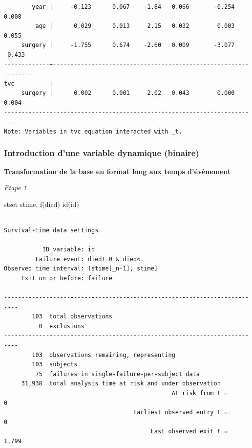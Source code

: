 \documentclass[
  12pt,
  letterpaper,
  DIV=11,
  numbers=noendperiod,
  onepage,
  openany]{scrreprt}
\newenvironment{Shaded}{\begin{snugshade}}{\end{snugshade}}
\newcommand{\KeywordTok}[1]{\textcolor[rgb]{0.94,0.87,0.69}{#1}}
\newcommand{\NormalTok}[1]{\textcolor[rgb]{0.80,0.80,0.80}{#1}}
\begin{document}
\begin{verbatim}
        year |     -0.123      0.067    -1.84   0.066       -0.254       0.008
         age |      0.029      0.013     2.15   0.032        0.003       0.055
     surgery |     -1.755      0.674    -2.60   0.009       -3.077      -0.433
-------------+----------------------------------------------------------------
tvc          |
     surgery |      0.002      0.001     2.02   0.043        0.000       0.004
------------------------------------------------------------------------------
Note: Variables in tvc equation interacted with _t.
\end{verbatim}

\hypertarget{introduction-dune-variable-dynamique-binaire-1}{%
\subsubsection{Introduction d'une variable dynamique
(binaire)}\label{introduction-dune-variable-dynamique-binaire-1}}

\textbf{Transformation de la base en format long aux temps d'évènement}

\emph{Etape 1}

\begin{Shaded}
\begin{Highlighting}[]
\KeywordTok{stset}\NormalTok{ stime, f(died) id(id)}
\end{Highlighting}
\end{Shaded}

\begin{verbatim}

Survival-time data settings

           ID variable: id
         Failure event: died!=0 & died<.
Observed time interval: (stime[_n-1], stime]
     Exit on or before: failure

--------------------------------------------------------------------------
        103  total observations
          0  exclusions
--------------------------------------------------------------------------
        103  observations remaining, representing
        103  subjects
         75  failures in single-failure-per-subject data
     31,938  total analysis time at risk and under observation
                                                At risk from t =         0
                                     Earliest observed entry t =         0
                                          Last observed exit t =     1,799
\end{verbatim}
\end{document}

